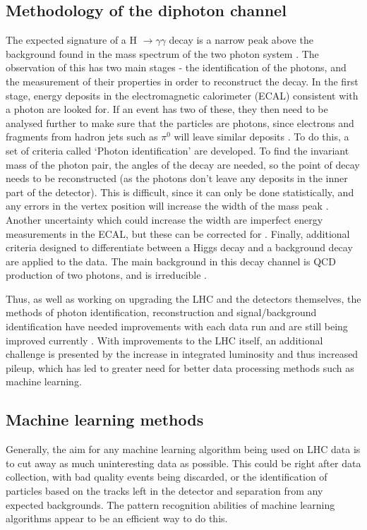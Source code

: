 \documentclass[12pt]{article}
\begin{document}
\subsection*{Methodology of the diphoton channel}
The expected signature of a H $\rightarrow \gamma\gamma$ decay is a narrow peak above the background found in the mass spectrum of the two photon system \cite{sethpresentation}. The observation of this has two main stages - the identification of the photons, and the measurement of their properties in order to reconstruct the decay. In the first stage, energy deposits in the electromagnetic calorimeter (ECAL) consistent with a photon are looked for. If an event has two of these, they then need to be analysed further to make sure that the particles are photons, since electrons and fragments from hadron jets such as $\pi^{0}$ will leave similar deposits \cite{recon}. To do this, a set of criteria called `Photon identification' are developed. To find the invariant mass of the photon pair, the angles of the decay are needed, so the point of decay needs to be reconstructed (as the photons don't leave any deposits in the inner part of the detector). This is difficult, since it can only be done statistically, and any errors in the vertex position will increase the width of the mass peak \cite{review1}. Another uncertainty which could increase the width are imperfect energy measurements in the ECAL, but these can be corrected for \cite{cmslimits}. Finally, additional criteria designed to differentiate between a Higgs decay and a background decay are applied to the data. The main background in this decay channel is QCD production of two photons, and is irreducible \cite{atlaslimits}. 

Thus, as well as working on upgrading the LHC and the detectors themselves, the methods of photon identification, reconstruction and signal/background identification have needed improvements with each data run and are still being improved currently \cite{cms13tev1}. With improvements to the LHC itself, an additional challenge is presented by the increase in integrated luminosity and thus increased pileup, which has led to greater need for better data processing methods such as machine learning.


\subsection*{Machine learning methods}

Generally, the aim for any machine learning algorithm being used on LHC data is to cut away as much uninteresting data as possible. This could be right after data collection, with bad quality events being discarded, or the identification of particles based on the tracks left in the detector and separation from any expected backgrounds. The pattern recognition abilities of machine learning algorithms appear to be an efficient way to do this. 
\end{document}
